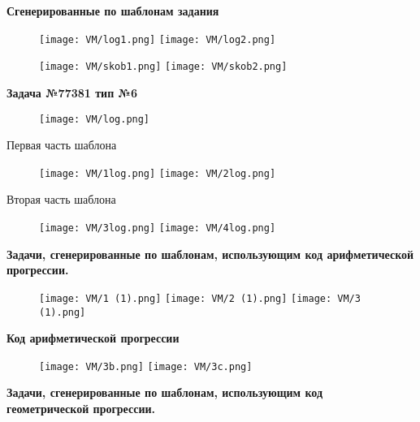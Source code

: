\textbf{Сгенерированные по шаблонам задания}

\begin{figure}[h]
		\centering
		\texttt{[image: VM/log1.png]}
		\texttt{[image: VM/log2.png]}
		\end{figure}
		\begin{figure}[h]
		\centering
		\texttt{[image: VM/skob1.png]}
		\texttt{[image: VM/skob2.png]}
\end{figure}

\textbf{Задача №77381 тип №6}

\begin{figure}[h]
	\centering
	\texttt{[image: VM/log.png]}
\end{figure}

\newpage

Первая часть шаблона
	
\begin{figure}[h]
		\centering
		\texttt{[image: VM/1log.png]}
		\texttt{[image: VM/2log.png]}
\end{figure}

\newpage

Вторая часть шаблона

\begin{figure}[h]
		\centering
		\texttt{[image: VM/3log.png]}
		\texttt{[image: VM/4log.png]}
\end{figure}

\textbf{Задачи, сгенерированные по шаблонам, использующим код арифметической прогрессии.}
	\begin{figure}[h]
		\centering
		\texttt{[image: VM/1 (1).png]}
		\texttt{[image: VM/2 (1).png]}
		\texttt{[image: VM/3 (1).png]}
	\end{figure}
	
\newpage

\textbf{Код арифметической прогрессии}

	\begin{figure}[h]
		\centering
		\texttt{[image: VM/3b.png]}
		\texttt{[image: VM/3c.png]}
	\end{figure}

\textbf{Задачи, сгенерированные по шаблонам, использующим код 
\\геометрической прогрессии.}

